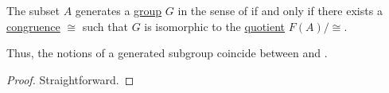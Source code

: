 \begin{proposition}\label{thm:group_presentation_generating_set}
  The subset \( A \) generates a \hyperref[def:group]{group} \( G \) in the sense of  if and only if there exists a \hyperref[def:first_order_congruence]{congruence} \( {\cong} \) such that \( G \) is isomorphic to the \hyperref[def:group/quotient]{quotient} \( F(A) / {\cong} \).
\end{proposition}
\begin{comments}
  \item Thus, the notions of a generated subgroup coincide between  and .
\end{comments}
\begin{proof}
  Straightforward.
\end{proof}

